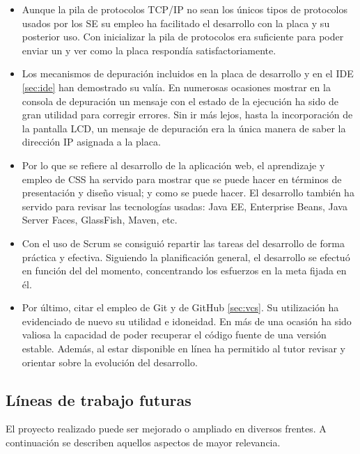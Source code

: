 \begin{itemize}
  \item Aunque la pila de protocolos TCP/IP no sean los únicos tipos de 
  protocolos usados por los SE su empleo ha facilitado el desarrollo con la
  placa y su posterior uso. Con inicializar la pila de protocolos era suficiente
  para poder enviar un  y ver como la  placa respondía 
  satisfactoriamente.

  \item Los mecanismos de depuración incluidos en la placa de desarrollo y en el
  IDE \ref{sec:ide} han demostrado su valía. En numerosas ocasiones mostrar
  en la consola de depuración un mensaje con el estado de la ejecución ha sido
  de gran utilidad para corregir errores. Sin ir más lejos, hasta la
  incorporación de la pantalla LCD, un mensaje de depuración era la única manera
  de saber la dirección IP asignada a la placa.

  \item Por lo que se refiere al desarrollo de la aplicación web, el aprendizaje
  y empleo de CSS ha servido para mostrar que se puede hacer en términos de
  presentación y diseño visual; y como se puede hacer. El desarrollo también
  ha servido para revisar las tecnologías usadas: Java EE, Enterprise Beans,
  Java Server Faces, GlassFish, Maven, etc.
 
  \item Con el uso de Scrum se consiguió repartir las tareas del desarrollo
  de forma práctica y efectiva. Siguiendo la planificación general, el
  desarrollo se efectuó en función del  del momento,
  concentrando los esfuerzos en la meta fijada en él.

  \item Por último, citar el empleo de Git y de GitHub \ref{sec:vcs}. Su
  utilización ha evidenciado de nuevo su utilidad e idoneidad. En más de una
  ocasión ha sido valiosa la capacidad de poder recuperar el código fuente de
  una versión estable. Además, al estar disponible en línea ha permitido al
  tutor revisar y orientar sobre la evolución del desarrollo.
\end{itemize}

\subsection{Líneas de trabajo futuras}{\label{sec:lines-futuras}}
El proyecto realizado puede ser mejorado o ampliado en diversos frentes.
A continuación se describen aquellos aspectos de mayor relevancia.

